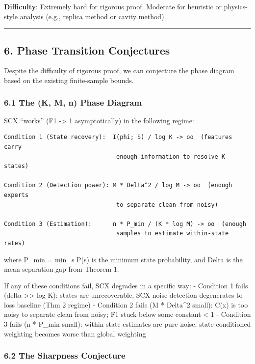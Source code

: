 \documentclass[
  12pt,
]{article}
\begin{document}
\textbf{Difficulty}: Extremely hard for rigorous proof. Moderate for
heuristic or physics-style analysis (e.g., replica method or cavity
method).

\begin{center}\rule{0.5\linewidth}{0.5pt}\end{center}

\subsection{6. Phase Transition
Conjectures}\label{phase-transition-conjectures}

Despite the difficulty of rigorous proof, we can conjecture the phase
diagram based on the existing finite-sample bounds.

\subsubsection{6.1 The (K, M, n) Phase
Diagram}\label{the-k-m-n-phase-diagram}

SCX ``works'' (F1 -\textgreater{} 1 asymptotically) in the following
regime:

\begin{verbatim}
Condition 1 (State recovery):  I(phi; S) / log K -> oo  (features carry
                                enough information to resolve K states)

Condition 2 (Detection power): M * Delta^2 / log M -> oo  (enough experts
                                to separate clean from noisy)

Condition 3 (Estimation):      n * P_min / (K * log M) -> oo  (enough
                                samples to estimate within-state rates)
\end{verbatim}

where P\_min = min\_s P(s) is the minimum state probability, and Delta
is the mean separation gap from Theorem 1.

If any of these conditions fail, SCX degrades in a specific way: -
Condition 1 fails (delta \textgreater\textgreater{} log K): states are
unrecoverable, SCX noise detection degenerates to loss baseline (Thm 2
regime) - Condition 2 fails (M * Delta\^{}2 small): C(x) is too noisy to
separate clean from noisy; F1 stuck below some constant \textless{} 1 -
Condition 3 fails (n * P\_min small): within-state estimates are pure
noise; state-conditioned weighting becomes worse than global weighting

\subsubsection{6.2 The Sharpness
Conjecture}\label{the-sharpness-conjecture}
\end{document}
